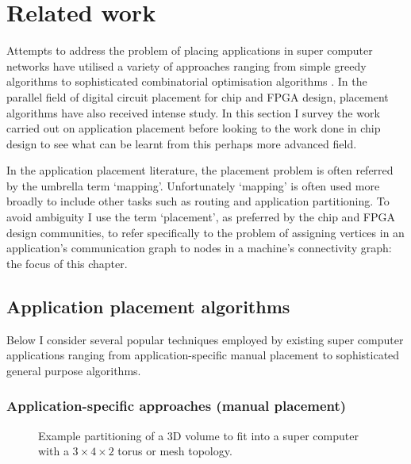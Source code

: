 	\section{Related work}
		
		Attempts to address the problem of placing applications in super computer
		networks have utilised a variety of approaches ranging from simple greedy
		algorithms to sophisticated combinatorial optimisation algorithms
		\cite{jeannot14}. In the parallel field of digital circuit placement for
		chip and FPGA design, placement algorithms have also received intense
		study.  In this section I survey the work carried out on application
		placement before looking to the work done in chip design to see what can be
		learnt from this perhaps more advanced field.
		
		In the application placement literature, the placement problem is often
		referred by the umbrella term `mapping'. Unfortunately `mapping' is often
		used more broadly to include other tasks such as routing and application
		partitioning. To avoid ambiguity I use the term `placement', as preferred
		by the chip and FPGA design communities, to refer specifically to the
		problem of assigning vertices in an application's communication graph to
		nodes in a machine's connectivity graph: the focus of this chapter.
		
		\subsection{Application placement algorithms}
			
			Below I consider several popular techniques employed by existing super
			computer applications ranging from application-specific manual placement
			to sophisticated general purpose algorithms.
			
			\subsubsection{Application-specific approaches (manual placement)}
				
				\begin{figure}
					\center
					
					\caption[Partitioning of a 3D volumn for a $3\times4\times2$ torus.]%
					{Example partitioning of a 3D volume to fit into a super
					computer with a $3\times4\times2$ torus or mesh topology.}
					\label{fig:fem-partitioning}
				\end{figure}
				
